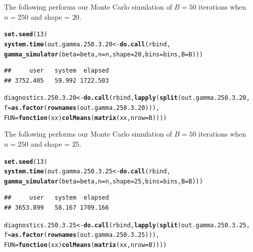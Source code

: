 \documentclass[11pt]{article}\usepackage[]{graphicx}\usepackage[]{color}
\makeatletter
\newcommand{\hlnum}[1]{\textcolor[rgb]{0.686,0.059,0.569}{#1}}%
\newcommand{\hlstd}[1]{\textcolor[rgb]{0.345,0.345,0.345}{#1}}%
\newcommand{\hlkwa}[1]{\textcolor[rgb]{0.161,0.373,0.58}{\textbf{#1}}}%
\newcommand{\hlkwb}[1]{\textcolor[rgb]{0.69,0.353,0.396}{#1}}%
\newcommand{\hlkwc}[1]{\textcolor[rgb]{0.333,0.667,0.333}{#1}}%
\newcommand{\hlkwd}[1]{\textcolor[rgb]{0.737,0.353,0.396}{\textbf{#1}}}%
\newenvironment{kframe}{%
 \def\at@end@of@kframe{}%
 \ifinner\ifhmode%
  \def\at@end@of@kframe{\end{minipage}}%
  \begin{minipage}{\columnwidth}%
 \fi\fi%
 \def\FrameCommand##1{\hskip\@totalleftmargin \hskip-\fboxsep
 \colorbox{shadecolor}{##1}\hskip-\fboxsep
     \hskip-\linewidth \hskip-\@totalleftmargin \hskip\columnwidth}%
 \MakeFramed {\advance\hsize-\width
   \@totalleftmargin\z@ \linewidth\hsize
   \@setminipage}}%
 {\par\unskip\endMakeFramed%
 \at@end@of@kframe}
\newenvironment{knitrout}{}{} %
\makeatother
\begin{document}
The following performs our Monte Carlo simulation of $B = 50$ iterations 
when $n = 250$ and shape = $20$.

\begin{knitrout}
\color{fgcolor}\begin{kframe}
\begin{alltt}
\hlkwd{set.seed}\hlstd{(}\hlnum{13}\hlstd{)}
\hlkwd{system.time}\hlstd{(out.gamma.250.3.20} \hlkwb{<-} \hlkwd{do.call}\hlstd{(rbind,}
  \hlkwd{gamma_simulator}\hlstd{(}\hlkwc{beta} \hlstd{= beta,} \hlkwc{n} \hlstd{= n,} \hlkwc{shape} \hlstd{=} \hlnum{20}\hlstd{,} \hlkwc{bins} \hlstd{= bins,} \hlkwc{B} \hlstd{= B)))}
\end{alltt}
\begin{verbatim}
##     user   system  elapsed 
## 3752.405   59.992 1722.503
\end{verbatim}
\begin{alltt}
\hlstd{diagnostics.250.3.20} \hlkwb{<-} \hlkwd{do.call}\hlstd{(rbind,} \hlkwd{lapply}\hlstd{(}\hlkwd{split}\hlstd{(out.gamma.250.3.20,}
  \hlkwc{f} \hlstd{=} \hlkwd{as.factor}\hlstd{(}\hlkwd{rownames}\hlstd{(out.gamma.250.3.20))),}
  \hlkwc{FUN} \hlstd{=} \hlkwa{function}\hlstd{(}\hlkwc{xx}\hlstd{)} \hlkwd{colMeans}\hlstd{(}\hlkwd{matrix}\hlstd{(xx,} \hlkwc{nrow} \hlstd{= B))))}
\end{alltt}
\end{kframe}
\end{knitrout}




The following performs our Monte Carlo simulation of $B = 50$ iterations 
when $n = 250$ and shape = $25$.

\begin{knitrout}
\color{fgcolor}\begin{kframe}
\begin{alltt}
\hlkwd{set.seed}\hlstd{(}\hlnum{13}\hlstd{)}
\hlkwd{system.time}\hlstd{(out.gamma.250.3.25} \hlkwb{<-} \hlkwd{do.call}\hlstd{(rbind,}
  \hlkwd{gamma_simulator}\hlstd{(}\hlkwc{beta} \hlstd{= beta,} \hlkwc{n} \hlstd{= n,} \hlkwc{shape} \hlstd{=} \hlnum{25}\hlstd{,} \hlkwc{bins} \hlstd{= bins,} \hlkwc{B} \hlstd{= B)))}
\end{alltt}
\begin{verbatim}
##     user   system  elapsed 
## 3653.899   58.167 1709.166
\end{verbatim}
\begin{alltt}
\hlstd{diagnostics.250.3.25} \hlkwb{<-} \hlkwd{do.call}\hlstd{(rbind,} \hlkwd{lapply}\hlstd{(}\hlkwd{split}\hlstd{(out.gamma.250.3.25,}
  \hlkwc{f} \hlstd{=} \hlkwd{as.factor}\hlstd{(}\hlkwd{rownames}\hlstd{(out.gamma.250.3.25))),}
  \hlkwc{FUN} \hlstd{=} \hlkwa{function}\hlstd{(}\hlkwc{xx}\hlstd{)} \hlkwd{colMeans}\hlstd{(}\hlkwd{matrix}\hlstd{(xx,} \hlkwc{nrow} \hlstd{= B))))}
\end{alltt}
\end{kframe}
\end{knitrout}
\end{document}
